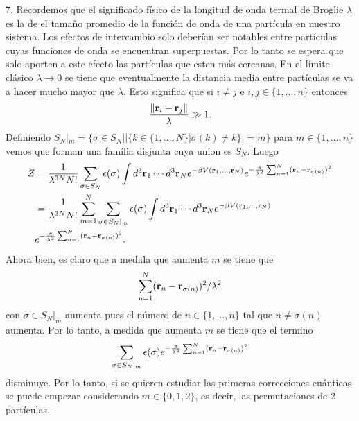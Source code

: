 \documentclass{article}
\begin{document}
7. Recordemos que el significado físico de la longitud de onda termal de Broglie $\lambda$ es la de el tamaño promedio de la función de onda de una partícula en nuestro sistema. Los efectos de intercambio solo deberían ser notables entre partículas cuyas funciones de onda se encuentran superpuestas. Por lo tanto se espera que solo aporten a este efecto las partículas que esten más cercanas. En el límite clásico $\lambda\rightarrow 0$ se tiene que eventualmente la distancia media entre partículas se va a hacer mucho mayor que $\lambda$. Esto significa que si $i\neq j$ e $i,j\in\{1,\dots,n\}$ entonces
\begin{equation}
\frac{\|\vb{r}_i-\vb{r}_j\|}{\lambda}\gg 1.
\end{equation}
Definiendo $S_N|_m=\{\sigma\in S_N||\{k\in\{1,\dots,N\}|\sigma(k)\neq k\}|=m\}$ para $m\in\{1,\dots,n\}$ vemos que forman una familia disjunta cuya union es $S_N$. Luego 
\begin{align}
\begin{split}
Z&=\frac{1}{\lambda^{3N}N!}\sum_{\sigma\in S_N}\epsilon(\sigma)\int d^3\vb{r}_1\cdots d^3\vb{r}_N e^{-\beta V(\vb{r}_1,\dots,\vb{r}_N)}e^{-\frac{\pi}{\lambda^2}\sum_{n=1}^N(\vb{r}_n-\vb{r}_{\sigma(n)})^2}\\
&=\frac{1}{\lambda^{3N}N!}\sum_{m=1}^N\sum_{\sigma\in S_N|_m}\epsilon(\sigma)\int d^3\vb{r}_1\cdots d^3\vb{r}_N e^{-\beta V(\vb{r}_1,\dots,\vb{r}_N)}\\
&e^{-\frac{\pi}{\lambda^2}\sum_{n=1}^N(\vb{r}_n-\vb{r}_{\sigma(n)})^2}.
\end{split}
\end{align}
Ahora bien, es claro que a medida que aumenta $m$ se tiene que 
\begin{equation}
\sum_{n=1}^N(\vb{r}_n-\vb{r}_{\sigma(n)})^2/\lambda^2
\end{equation}
con $\sigma\in S_N|_m$ aumenta pues el número de $n\in\{1,\dots,n\}$ tal que $n\neq\sigma(n)$ aumenta. Por lo tanto, a medida que aumenta $m$ se tiene que el termino
\begin{equation}
\sum_{\sigma\in S_N|_m}\epsilon(\sigma)e^{-\frac{\pi}{\lambda^2}\sum_{n=1}^N(\vb{r}_n-\vb{r}_{\sigma(n)})^2}
\end{equation}
disminuye. Por lo tanto, si se quieren estudiar las primeras correcciones cuánticas se puede empezar considerando $m\in\{0,1,2\}$, es decir, las permutaciones de 2 partículas.
\end{document}
